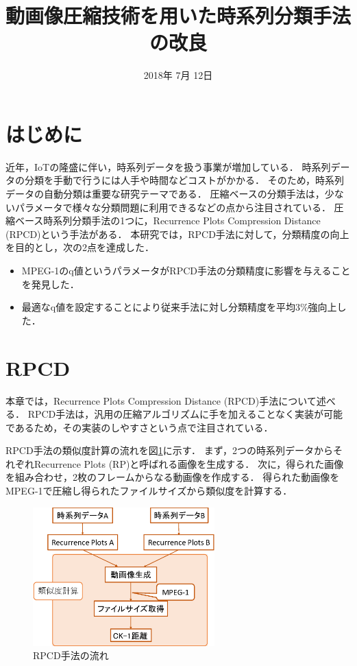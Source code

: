 \documentclass{interim} %
\date{2018年 7月 12日}
\title{動画像圧縮技術を用いた時系列分類手法の改良}
\begin{document}
\maketitle

\section{はじめに}
近年，IoTの隆盛に伴い，時系列データを扱う事業が増加している．
時系列データの分類を手動で行うには人手や時間などコストがかかる．
そのため，時系列データの自動分類は重要な研究テーマである．
圧縮ベースの分類手法は，少ないパラメータで様々な分類問題に利用できるなどの点から注目されている．
圧縮ベース時系列分類手法の1つに，Recurrence Plots Compression Distance (RPCD)という手法がある\cite{RP}．
本研究では，RPCD手法に対して，分類精度の向上を目的とし，次の2点を達成した．
\begin{itemize}
	\item MPEG-1のq値というパラメータがRPCD手法の分類精度に影響を与えることを発見した．
	\item 最適なq値を設定することにより従来手法に対し分類精度を平均3\%強向上した．
\end{itemize}
\section{RPCD}
本章では，Recurrence Plots Compression Distance (RPCD)手法について述べる．
RPCD手法は，汎用の圧縮アルゴリズムに手を加えることなく実装が可能であるため，その実装のしやすさという点で注目されている．
\par
RPCD手法の類似度計算の流れを図\ref{fig:RPCD}に示す．
まず，2つの時系列データからそれぞれRecurrence Plots (RP)と呼ばれる画像を生成する．
次に，得られた画像を組み合わせ，2枚のフレームからなる動画像を作成する．
得られた動画像をMPEG-1で圧縮し得られたファイルサイズから類似度を計算する．


\begin{figure}[t]
	\centering
	\includegraphics[width=7cm]{RPCD.eps}
	\caption{RPCD手法の流れ}
	\label{fig:RPCD}
\end{figure}
\end{document}
